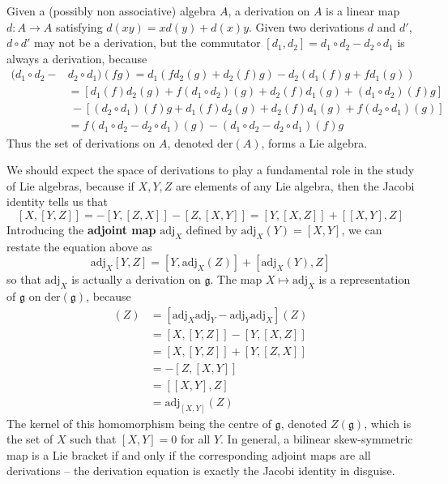 \begin{example}
    Given a (possibly non associative) algebra $A$, a derivation on $A$ is a linear map $d: A \to A$ satisfying $d(xy) = xd(y) + d(x)y$. Given two derivations $d$ and $d'$, $d \circ d'$ may not be a derivation, but the commutator $[d_1, d_2] = d_1 \circ d_2 - d_2 \circ d_1$ is always a derivation, because
    \begin{align*}
        (d_1 \circ d_2 - &d_2 \circ d_1)(fg) = d_1(f d_2(g) + d_2(f) g) - d_2(d_1(f) g + f d_1(g))\\
        &= [d_1(f) d_2(g) + f (d_1 \circ d_2)(g) + d_2(f) d_1(g) + (d_1 \circ d_2)(f) g]\\
        &\ - [(d_2 \circ d_1)(f) g + d_1(f) d_2(g) + d_2(f) d_1(g) + f (d_2 \circ d_1)(g)]\\
        &= f(d_1 \circ d_2 - d_2 \circ d_1)(g) - (d_1 \circ d_2 - d_2 \circ d_1)(f) g
    \end{align*}
    Thus the set of derivations on $A$, denoted $\text{der}(A)$, forms a Lie algebra.

    We should expect the space of derivations to play a fundamental role in the study of Lie algebras, because if $X,Y,Z$ are elements of any Lie algebra, then the Jacobi identity tells us that
    \[ [X,[Y,Z]] = - [Y,[Z,X]] - [Z,[X,Y]] = [Y,[X,Z]] + [[X,Y],Z] \]
    Introducing the {\bf adjoint map} $\text{adj}_X$ defined by $\text{adj}_X(Y) = [X,Y]$, we can restate the equation above as
    \[ \text{adj}_X[Y,Z] = [Y, \text{adj}_X(Z)] + [\text{adj}_X(Y), Z] \]
    so that $\text{adj}_X$ is actually a derivation on $\mathfrak{g}$. The map $X \mapsto \text{adj}_X$ is a representation of $\mathfrak{g}$ on $\text{der}(\mathfrak{g})$, because
    \begin{align*}
        [\text{adj}_X, \text{adj}_Y](Z) &= [\text{adj}_X \text{adj}_Y - \text{adj}_Y \text{adj}_X](Z)\\
        &= [X,[Y,Z]] - [Y,[X,Z]]\\
        &= [X,[Y,Z]] + [Y,[Z,X]]\\
        &= -[Z,[X,Y]]\\
        &= [[X,Y],Z]\\
        &= \text{adj}_{[X,Y]}(Z)
    \end{align*}
    The kernel of this homomorphism being the centre of $\mathfrak{g}$, denoted $Z(\mathfrak{g})$, which is the set of $X$ such that $[X,Y] = 0$ for all $Y$. In general, a bilinear skew-symmetric map is a Lie bracket if and only if the corresponding adjoint maps are all derivations -- the derivation equation is exactly the Jacobi identity in disguise.
\end{example}

